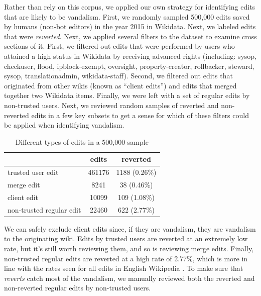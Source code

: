 \documentclass{sig-alternate-2013}
\begin{document}
Rather than rely on this corpus, we applied our own strategy for identifying edits that are likely to be vandalism. First, we randomly sampled 500,000 edits saved by humans (non-bot editors) in the year 2015 in Wikidata. Next, we labeled edits that were \textit{reverted}. Next, we applied several filters to the dataset to examine cross sections of it. First, we filtered out edits that were performed by users who attained a high status in Wikidata by receiving advanced rights (including: sysop, checkuser, flood, ipblock-exempt, oversight, property-creator, rollbacker, steward, sysop, translationadmin, wikidata-staff).  Second, we filtered out edits that originated from other wikis (known as ``client edits'') and edits that merged together two Wikidata items. Finally, we were left with a set of regular edits by non-trusted users.  Next, we reviewed random samples of reverted and non-reverted edits in a few key subsets to get a sense for which of these filters could be applied when identifying vandalism.

\begin{table}
\centering
\caption{Different types of edits in a 500,000 sample}
\begin{tabular}{l|c|c} \hline
& edits & reverted \\ \hline
trusted user edit & 461176 & 1188 (0.26\%)\\ \hline
merge edit & 8241 & 38 (0.46\%) \\ \hline
client edit & 10099 & 109 (1.08\%) \\ \hline
non-trusted regular edit & 22460 & 622 (2.77\%)
\end{tabular}
\end{table}

We can safely exclude client edits since, if they are vandalism, they are vandalism to the originating wiki. Edits by trusted users are reverted at an extremely low rate, but it's still worth reviewing them, and so is reviewing merge edits. Finally, non-trusted regular edits are reverted at a high rate of 2.77\%, which is more in line with the rates seen for all edits in English Wikipedia \cite{potthast:crowdsourcing}.  To make sure that \textit{reverts} catch most of the vandalism, we manually reviewed both the reverted and non-reverted regular edits by non-trusted users.
\end{document}
